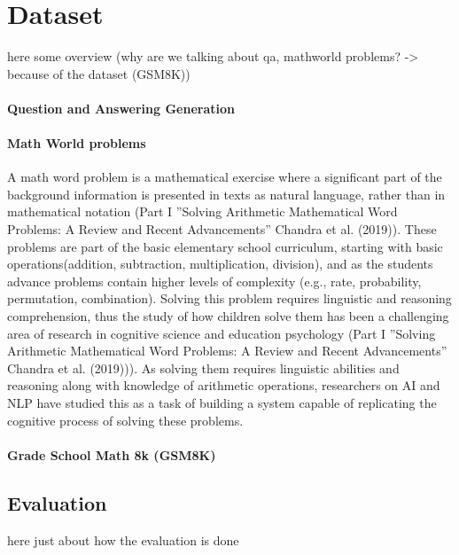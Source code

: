 \documentclass[a4paper,10pt]{article}
\title{}
\author{Jose Rodriguez}
\begin{document}
\maketitle

\begin{abstract}

\end{abstract}

\section{Dataset}
here some overview (why are we talking about qa, mathworld problems? -> because of the dataset (GSM8K))
\paragraph{Question and Answering Generation}
\paragraph{Math World problems}
A math word problem is a mathematical exercise where a significant part of the background information is presented in texts as natural language, rather than in mathematical notation (Part I ”Solving Arithmetic Mathematical Word Problems: A Review and Recent Advancements” Chandra et al. (2019)). These problems are part of the basic elementary school curriculum, starting with basic operations(addition, subtraction, multiplication, division), and as the students advance problems contain higher levels of complexity (e.g., rate, probability, permutation, combination). Solving this problem requires linguistic and reasoning comprehension, thus the study of how children solve them has been a challenging area of research in cognitive science and education psychology (Part I ”Solving Arithmetic Mathematical Word Problems: A Review and Recent Advancements” Chandra et al. (2019))). As solving them requires linguistic abilities and reasoning along with knowledge of arithmetic operations, researchers on AI and NLP have studied this as a task of building a system capable of replicating the cognitive process of solving these problems. 
\paragraph{Grade School Math 8k (GSM8K)}
\subsection{Evaluation}
here just about how the evaluation is done
\end{document}

